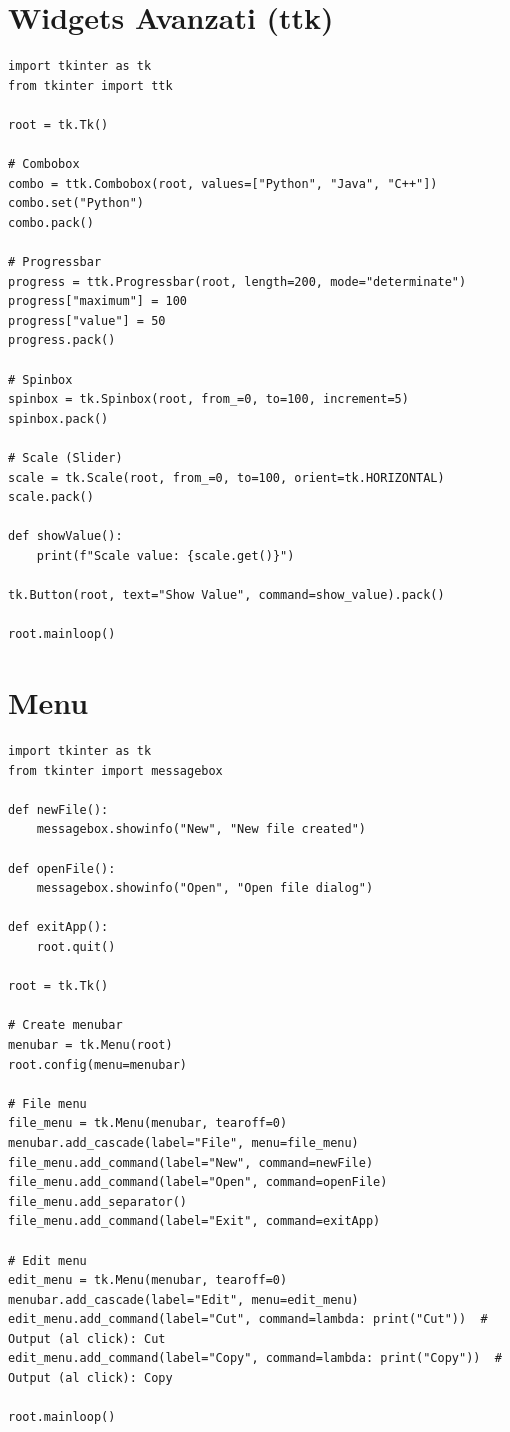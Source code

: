 \section{Widgets Avanzati (ttk)}

\begin{lstlisting}
import tkinter as tk
from tkinter import ttk

root = tk.Tk()

# Combobox
combo = ttk.Combobox(root, values=["Python", "Java", "C++"])
combo.set("Python")
combo.pack()

# Progressbar
progress = ttk.Progressbar(root, length=200, mode="determinate")
progress["maximum"] = 100
progress["value"] = 50
progress.pack()

# Spinbox
spinbox = tk.Spinbox(root, from_=0, to=100, increment=5)
spinbox.pack()

# Scale (Slider)
scale = tk.Scale(root, from_=0, to=100, orient=tk.HORIZONTAL)
scale.pack()

def showValue():
    print(f"Scale value: {scale.get()}")

tk.Button(root, text="Show Value", command=show_value).pack()

root.mainloop()
\end{lstlisting}

\section{Menu}

\begin{lstlisting}
import tkinter as tk
from tkinter import messagebox

def newFile():
    messagebox.showinfo("New", "New file created")

def openFile():
    messagebox.showinfo("Open", "Open file dialog")

def exitApp():
    root.quit()

root = tk.Tk()

# Create menubar
menubar = tk.Menu(root)
root.config(menu=menubar)

# File menu
file_menu = tk.Menu(menubar, tearoff=0)
menubar.add_cascade(label="File", menu=file_menu)
file_menu.add_command(label="New", command=newFile)
file_menu.add_command(label="Open", command=openFile)
file_menu.add_separator()
file_menu.add_command(label="Exit", command=exitApp)

# Edit menu
edit_menu = tk.Menu(menubar, tearoff=0)
menubar.add_cascade(label="Edit", menu=edit_menu)
edit_menu.add_command(label="Cut", command=lambda: print("Cut"))  # Output (al click): Cut
edit_menu.add_command(label="Copy", command=lambda: print("Copy"))  # Output (al click): Copy

root.mainloop()
\end{lstlisting}

